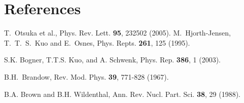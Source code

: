 \documentclass[a4paper]{jpconf}
\begin{document}
\section*{References}
\begin{thebibliography}{99}

T.~Otsuka et al., Phys. Rev. Lett. \textbf{95}, 232502 (2005).
M.~Hjorth-Jensen, T.~T.~S.~Kuo and E.~Osnes, Phys.
Repts. \textbf{261}, 125 (1995).

S.K. Bogner, T.T.S. Kuo, and A. Schwenk, Phys. Rep.
\textbf{386}, 1 (2003).

B.H.~Brandow, Rev. Mod. Phys. \textbf{39}, 771-828 (1967).

B.A. Brown and B.H. Wildenthal, Ann. Rev. Nucl. Part.
Sci. \textbf{38}, 29 (1988).


\end{thebibliography}
\end{document}
